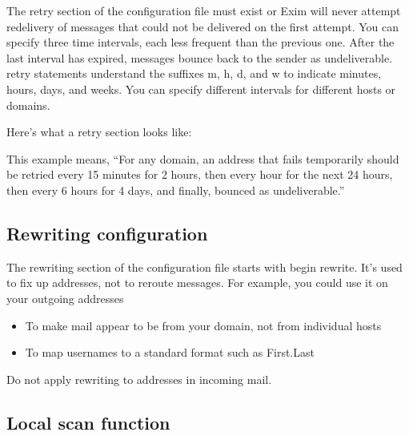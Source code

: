 \protect\hypertarget{part0026_split_052.htmlux5cux23_idIndexMarker2668}{}{}The
{retry} section of the configuration file must exist or Exim will never
attempt redelivery of messages that could not be delivered on the first
attempt. You can specify three time intervals, each less frequent than
the previous one. After the last interval has expired, messages bounce
back to the sender as undeliverable. {retry} statements understand the
suffixes {m}, {h}, {d}, and {w} to indicate minutes, hours, days, and
weeks. You can specify different intervals for different hosts or
domains.

Here's what a {retry} section looks like:


This example means, ``For any domain, an address that fails temporarily
should be retried every 15 minutes for 2 hours, then every hour for the
next 24 hours, then every 6 hours for 4 days, and finally, bounced as
undeliverable.''

\protect\hypertarget{part0026_split_053.html}{}{}

\hypertarget{part0026_split_053.htmlux5cux23_idContainer1247}{}
\hypertarget{part0026_split_053.htmlux5cux23calibre_pb_52}{%
\subsection[Rewriting
configuration]{\texorpdfstring{\protect\hypertarget{part0026_split_053.htmlux5cux23_idTextAnchor1159}{}{}Rewriting
configuration}{Rewriting configuration}}\label{part0026_split_053.htmlux5cux23calibre_pb_52}}

\protect\hypertarget{part0026_split_053.htmlux5cux23_idIndexMarker2669}{}{}The
rewriting section of the configuration file starts with {begin rewrite}.
It's used to fix up addresses, not to reroute messages. For example, you
could use it on your outgoing addresses

\begin{itemize}
\tightlist
\item
  To make mail appear to be from your domain, not from individual hosts
\item
  To map usernames to a standard format such as First.Last
\end{itemize}

Do not apply rewriting to addresses in incoming mail.

\protect\hypertarget{part0026_split_054.html}{}{}

\hypertarget{part0026_split_054.htmlux5cux23_idContainer1247}{}
\hypertarget{part0026_split_054.htmlux5cux23calibre_pb_53}{%
\subsection[Local scan
function]{\texorpdfstring{\protect\hypertarget{part0026_split_054.htmlux5cux23_idTextAnchor1160}{}{}Local
scan
function}{Local scan function}}\label{part0026_split_054.htmlux5cux23calibre_pb_53}}

